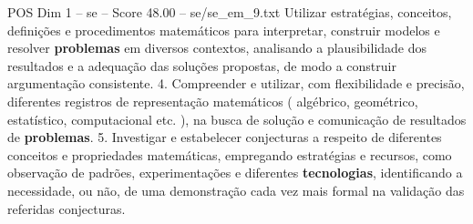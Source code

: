 \begin{textsample}{POS Dim 1 – se – Score 48.00 – se/se\_em\_9.txt}
Utilizar estratégias, conceitos, definições e procedimentos matemáticos para interpretar, construir modelos e resolver \textbf{problemas} em diversos contextos, analisando a plausibilidade dos resultados e a adequação das soluções propostas, de modo a construir argumentação consistente. 4.
Compreender e utilizar, com flexibilidade e precisão, diferentes registros de representação matemáticos ( algébrico, geométrico, estatístico, computacional etc. ), na busca de solução e comunicação de resultados de \textbf{problemas}. 5.
Investigar e estabelecer conjecturas a respeito de diferentes conceitos e propriedades matemáticas, empregando estratégias e recursos, como observação de padrões, experimentações e diferentes \textbf{tecnologias}, identificando a necessidade, ou não, de uma demonstração cada vez mais formal na validação das referidas conjecturas.

\end{textsample}
